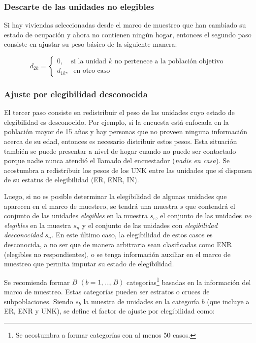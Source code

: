 \hypertarget{descarte-de-las-unidades-no-elegibles}{%
\subsubsection*{Descarte de las unidades no elegibles}\label{descarte-de-las-unidades-no-elegibles}}


Si hay viviendas seleccionadas desde el marco de muestreo que han cambiado su estado de ocupación y ahora no contienen ningún hogar, entonces el segundo paso consiste en ajustar su peso básico de la siguiente manera:

\[
d_{2k} = 
\begin{cases}
0, \ \ \ \ \ \text{si la unidad $k$ no pertenece a la población objetivo}\\
d_{1k},\ \ \ \text{en otro caso }
\end{cases}
\]

\hypertarget{ajuste-por-elegibilidad-desconocida}{%
\subsubsection*{Ajuste por elegibilidad desconocida}\label{ajuste-por-elegibilidad-desconocida}}


El tercer paso consiste en redistribuir el peso de las unidades cuyo estado de elegibilidad es desconocido. Por ejemplo, si la encuesta está enfocada en la población mayor de 15 años y hay personas que no proveen ninguna información acerca de su edad, entonces es necesario distribuir estos pesos. Esta situación también se puede presentar a nivel de hogar cuando no puede ser contactado porque nadie nunca atendió el llamado del encuestador (\emph{nadie en casa}). Se acostumbra a redistribuir los pesos de los UNK entre las unidades que sí disponen de su estatus de elegibilidad (ER, ENR, IN).

Luego, si no es posible determinar la elegibilidad de algunas unidades que aparecen en el marco de muestreo, se tendrá una muestra \(s\) que contendrá el conjunto de las unidades \emph{elegibles} en la muestra \(s_{e}\), el conjunto de las unidades \emph{no elegibles} en la muestra \(s_{n}\) y el conjunto de las unidades con \emph{elegibilidad desconocidad} \(s_{u}\). En este último caso, la elegibilidad de estos casos es desconocida, a no ser que de manera arbitraria sean clasificadas como ENR (elegibles no respondientes), o se tenga información auxiliar en el marco de muestreo que permita imputar su estado de elegibilidad.

Se recomienda formar \(B\) \((b = 1, \ldots, B)\) categorías\footnote{Se acostumbra a formar categorías con al menos 50 casos.} basadas en la información del marco de muestreo. Estas categorías pueden ser estratos o cruces de subpoblaciones. Siendo \(s_b\) la muestra de unidades en la categoría \(b\) (que incluye a ER, ENR y UNK), se define el factor de ajuste por elegibilidad como:

